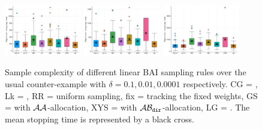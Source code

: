 \begin{figure}[t!]
 \centering
 \includegraphics[clip, width= 0.3\textwidth]{Chapter4/img/bai_sin_0-1}
 \includegraphics[clip, width= 0.3\textwidth]{Chapter4/img/bai_sin_0-01}
 \includegraphics[clip, width= 0.3\textwidth]{Chapter4/img/bai_sin_0-0001}
 \caption{Sample complexity of different linear BAI sampling rules over the usual counter-example with $\delta=0.1, 0.01, 0.0001$ respectively. CG = \LGC,  Lk = \LG, RR = uniform sampling, fix = tracking the fixed weights, GS = \XYS with $\mathcal{A}\mathcal{A}$-allocation, XYS = \XYS with $\mathcal{A}\mathcal{B}_{\texttt{dir}}$-allocation, LG = \LGapE. The mean stopping time is represented by a black cross.}
 \label{fig:sample_complexity_1}
\end{figure}

